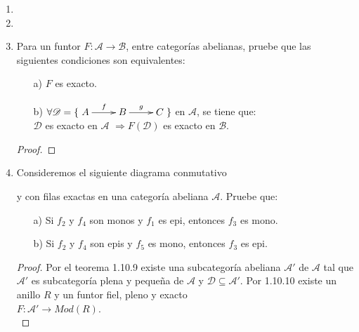 \documentclass{article}
\begin{document}
\begin{enumerate}[label=\textbf{Ej \arabic*.}]
\begin{proof}
\end{proof}

\item
\item

\item Para un funtor $F:\mathscr{A}\longrightarrow \mathscr{B}$, entre categorías abelianas, pruebe que las siguientes condiciones son equivalentes:

\begin{itemize}
\item[a)] $F$ es exacto.
\item[b)] $\forall \mathscr{D}=\{\xymatrix{A\ar[r]^f&B\ar[r]^g&C}\}$ en $\mathscr{A}$, se tiene que: \\$\mathscr{D}$ es exacto en  $\mathscr{A}$
$\Rightarrow F(\mathscr{D})$ es exacto en $\mathscr{B}$.
\end{itemize}

\begin{proof}



\end{proof}




\item Consideremos el siguiente diagrama conmutativo\\

\centerline{
}

y con filas exactas en una categoría abeliana $\mathscr{A}$. Pruebe que:

\begin{itemize}
\item[a)] Si $f_2$ y $f_4$ son monos y $f_1$ es epi, entonces $f_3$ es mono.
\item[b)] Si $f_2$ y $f_4$ son epis y $f_5$ es mono, entonces $f_3$ es epi.
\end{itemize}

\begin{proof}
Por el teorema 1.10.9 existe una subcategoría abeliana $\mathscr{A}'$ de $\mathscr{A}$ tal que $\mathscr{A}'$ es subcategoría plena y pequeña
de $\mathscr{A}$ y $\mathscr{D}\subseteq \mathscr{A}'$. Por 1.10.10 existe un anillo $R$ y un funtor fiel, pleno y exacto \\$F:\mathscr{A}'
\longrightarrow Mod(R)$.\\


\end{proof}
\end{enumerate}
\end{document}
